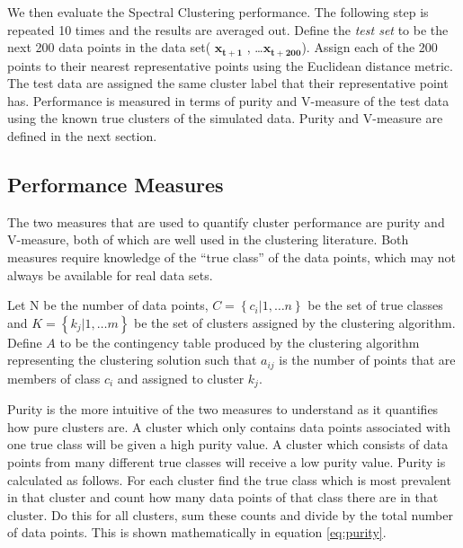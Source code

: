 We then evaluate the Spectral Clustering performance. The following step is repeated 10 times and the results are averaged out. Define the \textit{test set} to be the next 200 data points in the data set( $\boldsymbol{x_{t+1}}$ , \ldots  $\boldsymbol{x_{t+200}}$). Assign each of the 200 points to their nearest representative points using the Euclidean distance metric. The test data are assigned the same cluster label that their representative point has. Performance is measured in terms of purity and V-measure of the test data using the known true clusters of the simulated data. Purity and V-measure are defined in the next section.




\subsection{Performance Measures}
\label{sec:performance}
The two measures that are used to quantify cluster performance are purity and V-measure, both of which are well used in the clustering literature. Both measures require knowledge of the ``true class'' of the data points, which may not always be available for real data sets. 

Let N be the number of data points, $C = \left\{ c_i | 1, \ldots n  \right\} $ be the set of true classes and $K = \left\{ k_j | 1, \ldots m \right\}$ be the set of clusters assigned by the clustering algorithm.  Define $A$  to be  the contingency table produced by the clustering algorithm representing the clustering solution such that $a_{ij}$ is the number of points that are members of class $c_i$ and assigned to cluster $k_j$.

Purity is the more intuitive of the two measures to understand as it quantifies how pure clusters are. A cluster which only contains data points associated with one true class will be given a high purity value. A cluster which consists of data points from many different true classes will receive a low purity value.  Purity is calculated as follows. For each cluster find the true class which is most prevalent in that cluster and count how many data points of that class there are in that cluster. Do this for all clusters, sum these counts and divide by the total number of data points. This is shown mathematically in equation \eqref{eq:purity}.

